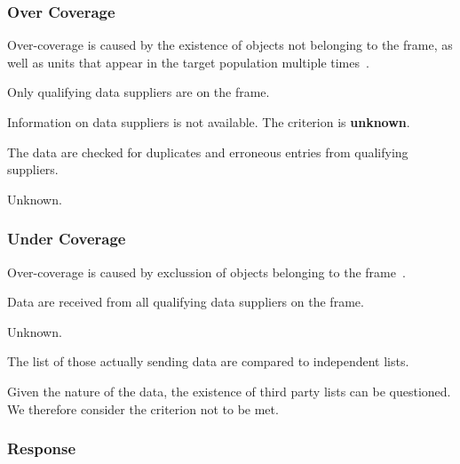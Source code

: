 \subsubsection{Over Coverage}

Over-coverage is caused by the existence of objects not belonging to the frame, as well as units that appear in the target population multiple times~\cite{over-coverage}.

\begin{QandA}
    \item Only qualifying data suppliers are on the frame.
    \begin{answered}
        Information on data suppliers is not available.
        The criterion is \textbf{unknown}.
    \end{answered}

    \item The data are checked for duplicates and erroneous entries from qualifying suppliers.
    \begin{answered}
        Unknown.
    \end{answered}

\end{QandA}

\subsubsection{Under Coverage}

Over-coverage is caused by exclussion of objects belonging to the frame~\cite{under-coverage}.

\begin{QandA}
    \item Data are received from all qualifying data suppliers on the frame.
    \begin{answered}
        Unknown.
    \end{answered}

    \item The list of those actually sending data are compared to independent lists.
    \begin{answered}
        Given the nature of the data, the existence of third party lists can be questioned.
        We therefore consider the criterion not to be met.
    \end{answered}

\end{QandA}

\subsubsection{Response}

